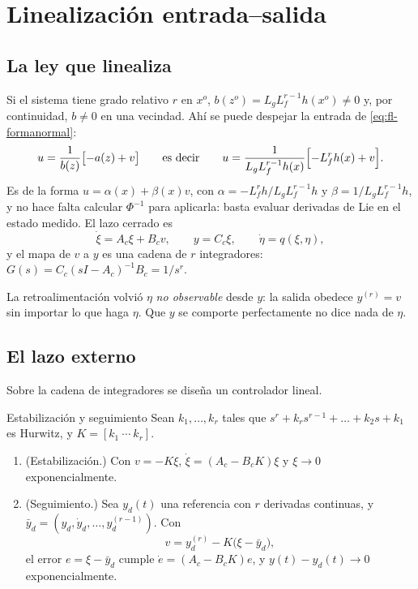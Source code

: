 \section{Linealización entrada--salida}
\label{sec:fl-io}

\subsection{La ley que linealiza}

Si el sistema tiene grado relativo $r$ en $x^o$, $b(z^o)=L_gL_f^{r-1}h(x^o)\neq0$ y, por continuidad, $b\neq0$ en una vecindad. Ahí se puede despejar la entrada de \eqref{eq:fl-formanormal}:
\begin{equation}
  u=\frac{1}{b(z)}\bigl[-a(z)+v\bigr]
  \qquad\text{es decir}\qquad
  u=\frac{1}{L_gL_f^{r-1}h(x)}\Bigl[-L_f^rh(x)+v\Bigr] .
  \label{eq:fl-ley}
\end{equation}
Es de la forma $u=\alpha(x)+\beta(x)v$, con $\alpha=-L_f^rh/L_gL_f^{r-1}h$ y $\beta=1/L_gL_f^{r-1}h$, y no hace falta calcular $\Phi^{-1}$ para aplicarla: basta evaluar derivadas de Lie en el estado medido. El lazo cerrado es
\begin{equation}
  \dot\xi=A_c\xi+B_cv,\qquad y=C_c\xi,\qquad \dot\eta=q(\xi,\eta),
  \label{eq:fl-lazocerrado}
\end{equation}
y el mapa de $v$ a $y$ es una cadena de $r$ integradores: $G(s)=C_c(sI-A_c)^{-1}B_c=1/s^r$.

\begin{ideaclave}
La retroalimentación volvió $\eta$ \emph{no observable} desde $y$: la salida obedece $y^{(r)}=v$ sin importar lo que haga $\eta$. Que $y$ se comporte perfectamente no dice nada de $\eta$.
\end{ideaclave}

\subsection{El lazo externo}

Sobre la cadena de integradores se diseña un controlador lineal.

\begin{proposicion}[label=prop:fl-seguimiento]{Estabilización y seguimiento}
Sean $k_1,\dots,k_r$ tales que $s^r+k_rs^{r-1}+\dots+k_2s+k_1$ es Hurwitz, y $K=[k_1\ \cdots\ k_r]$.
\begin{enumerate}
  \item (Estabilización.) Con $v=-K\xi$, $\dot\xi=(A_c-B_cK)\xi$ y $\xi\to0$ exponencialmente.
  \item (Seguimiento.) Sea $y_d(t)$ una referencia con $r$ derivadas continuas, y $\bar y_d=(y_d,\allowbreak\dot y_d,\allowbreak\dots,\allowbreak y_d^{(r-1)})$. Con
  \begin{equation}
    v=y_d^{(r)}-K\bigl(\xi-\bar y_d\bigr),
    \label{eq:fl-vseguimiento}
  \end{equation}
  el error $e=\xi-\bar y_d$ cumple $\dot e=(A_c-B_cK)e$, y $y(t)-y_d(t)\to0$ exponencialmente.
\end{enumerate}
\end{proposicion}

